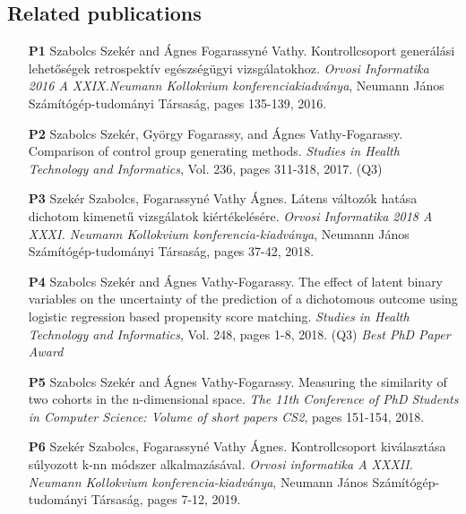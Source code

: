 		
		  
		  
		  
		  		
		\subsection*{Related publications}
										
		\begin{itemize}
			\item[\textbf{P1}] Szabolcs Szekér and Ágnes Fogarassyné Vathy. Kontrollcsoport generálási lehetőségek retrospektív egészségügyi vizsgálatokhoz. \textit{Orvosi Informatika 2016 A XXIX.Neumann Kollokvium konferenciakiadványa}, Neumann János Számítógép-tudományi Társaság, pages 135-139, 2016.
			\item[\textbf{P2}] Szabolcs Szekér, György Fogarassy, and Ágnes Vathy-Fogarassy. Comparison of control group generating methods. \textit{Studies in Health Technology and Informatics}, Vol. 236, pages 311-318, 2017. (Q3)
			\item[\textbf{P3}] Szekér Szabolcs, Fogarassyné Vathy Ágnes. Látens változók hatása dichotom kimenetű vizsgálatok kiértékelésére. \textit{Orvosi Informatika 2018 A XXXI. Neumann Kollokvium konferencia-kiadványa}, Neumann János Számítógép-tudományi Társaság, pages 37-42, 2018.
			\item[\textbf{P4}] Szabolcs Szekér and Ágnes Vathy-Fogarassy. The effect of latent binary variables on the uncertainty of the prediction of a dichotomous outcome using logistic regression based propensity score matching. \textit{Studies in Health Technology and Informatics}, Vol. 248, pages 1-8, 2018. (Q3) \textit{Best PhD Paper Award}
			\item[\textbf{P5}] Szabolcs Szekér and Ágnes Vathy-Fogarassy. Measuring the similarity of two cohorts in the n-dimensional space. \textit{The 11th Conference of PhD Students in Computer Science: Volume of short papers CS2}, pages 151-154, 2018.
			\item[\textbf{P6}] Szekér Szabolcs, Fogarassyné Vathy Ágnes. Kontrollcsoport kiválasztása súlyozott k-nn módszer alkalmazásával. \textit{Orvosi informatika A XXXII. Neumann Kollokvium konferencia-kiadványa}, Neumann János Számítógép-tudományi Társaság, pages 7-12, 2019.

\end{itemize}

